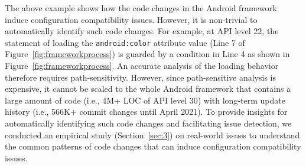 The above example shows how the code changes in the Android framework induce configuration compatibility issues.
However, it is non-trivial to automatically identify such code changes.
For example, at API level 22, the statement of loading the \texttt{android:color} attribute value (Line 7 of Figure~\ref{fig:frameworkprocess}) is guarded by a condition in Line 4 as shown in Figure~\ref {fig:frameworkprocess}. An accurate analysis of the loading behavior therefore requires path-sensitivity.
However, since path-sensitive analysis is expensive, it cannot be scaled to the whole Android framework that contains a large amount of code (i.e., 4M+ LOC of API level 30) with long-term update history (i.e., 566K+ commit changes until April 2021). 
To provide insights for automatically identifying such code changes and facilitating issue detection, we conducted an empirical study (Section~\ref{sec:3}) on real-world issues to understand the common patterns of code changes that can induce configuration compatibility issues.

